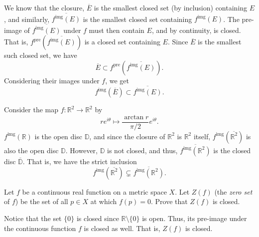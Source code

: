 \documentclass[12 pt, letterpaper]{hmcpset}
\begin{document}
\begin{solution}
	We know that the closure, $\overline{E}$ is the smallest closed set (by inclusion) containing $E$, and similarly, $\overline{f^{\text{img}}(E)}$ is the smallest closed set containing $f^{\text{img}}(E)$. The pre-image of $\overline{f^{\text{img}}(E)}$ under $f$ must then contain $E$, and by continuity, is closed. That is, $f^{\text{pre}}(\overline{f^{\text{img}}(E)})$ is a closed set containing $E$. Since $\overline{E}$ is the smallest such closed set, we have
	\[
		\overline{E} \subset f^{\text{pre}}(\overline{f^{\text{img}}(E)}).
	\]
	Considering their images under $f$, we get
	 \[
		f^{\text{img}}(\overline{E}) \subset \overline{f^{\text{img}}(E)}.
	\]

	Consider the map $f : \mathbb{R}^{2} \to \mathbb{R}^{2}$ by
	\[
		 r e^{i \theta} \mapsto \frac{\arctan{r}}{\pi / 2} e^{i \theta}.
	\]
	$f^{\text{img}}(\mathbb{R})$ is the open disc $\mathbb{D}$, and since the closure of $\mathbb{R}^{2}$ is $\mathbb{R}^{2}$ itself, $f^{\text{img}}(\overline{\mathbb{R}^{2}})$ is also the open disc $\mathbb{D}$. However, $\mathbb{D}$ is not closed, and thus, $\overline{f^{\text{img}}(\mathbb{R}^{2})}$ is the closed disc $\overline{\mathbb{D}}$. That is, we have the strict inclusion
	\[
		f^{\text{img}}(\overline{\mathbb{R}^{2}}) \subsetneq \overline{f^{\text{img}}(\mathbb{R}^{2})}.
	\]
\end{solution}

\pagebreak

\begin{problem}
	Let $f$ be a continuous real function on a metric space $X$. Let $Z(f)$ (the \emph{zero set} of $f$) be the set of all $p \in X$ at which $f(p) = 0$. Prove that $Z(f)$ is closed.
\end{problem}

\begin{solution}
	Notice that the set $\{ 0 \}$ is closed since $\mathbb{R} \setminus \{ 0 \}$ is open. Thus, its pre-image under the continuous function $f$ is closed as well. That is, $Z(f)$ is closed.
\end{solution}
\end{document}
